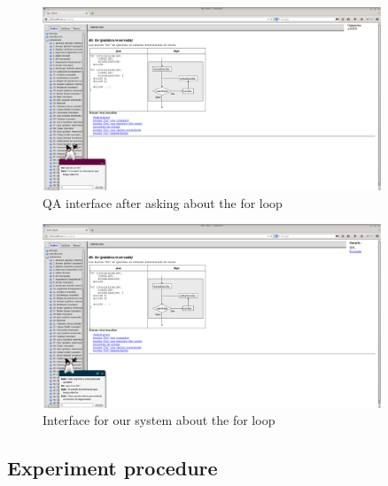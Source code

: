 \begin{figure}[!htbp]
    \centering
    \includegraphics[width=0.9\textwidth]{img/test/qa-client2.png}
    \caption{QA interface after asking about the for loop}
    \label{fig:qa-client-for}
\end{figure}
\begin{figure}[!htbp]
    \centering
    \includegraphics[width=0.9\textwidth]{img/test/ask-client.png}
    \caption{Interface for our system about the for loop}
    \label{fig:ask-client-for}
\end{figure}

\subsection{Experiment procedure}

